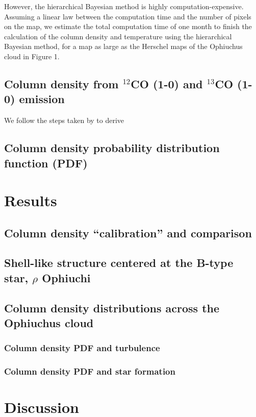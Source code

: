 \documentclass[11pt,a4paper]{emulateapj}
\begin{document}
However, the hierarchical Bayesian method is highly computation-expensive. Assuming a linear law between the computation time and the number of pixels on the map, we estimate the total computation time of one month to finish the calculation of the column density and temperature using the hierarchical Bayesian method, for a map as large as the Herschel maps of the Ophiuchus cloud in Figure 1.

\subsection{Column density from $^{12}$CO (1-0) and $^{13}$CO (1-0) emission}
We follow the steps taken by \citet{Pineda_2008} to derive

\subsection{Column density probability distribution function (PDF)}


\section{Results}
\label{sec:results}

\subsection{Column density ``calibration'' and comparison}

\subsection{Shell-like structure centered at the B-type star, $\rho$ Ophiuchi}

\subsection{Column density distributions across the Ophiuchus cloud}

\subsubsection{Column density PDF and turbulence}

\subsubsection{Column density PDF and star formation}

\section{Discussion}
\label{sec:discussion}
\end{document}
